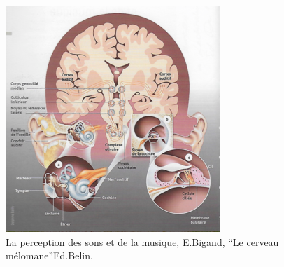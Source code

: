 \begin{figure}[th]
	\centering
	\includegraphics[width=0.7\linewidth]{images/schemacerveauoreillebigand.png}
	\caption[Schéma du déroulement]{La perception des sons et de
		la musique, E.Bigand, ``Le cerveau mélomane''Ed.Belin, \autocite{bigand:cerveau}}
	
	\label{cerveauoreillebigand1}
\end{figure}

